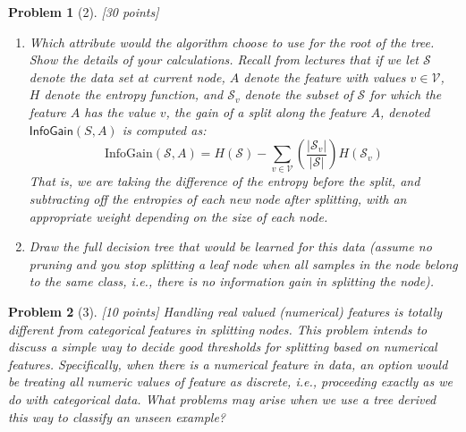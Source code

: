 \documentclass[11pt]{article}
\theoremstyle{quest}
\newtheorem*{problem}{Problem}
\begin{document}
\begin{problem}[2] [30 points]
\begin{enumerate}
    \item Which attribute would the algorithm choose to use for the root of the tree. Show the details of your calculations. Recall from lectures that if we let $\mathcal{S}$ denote the data set at current node, $A$ denote the feature with values $v \in \mathcal{V}$, $H$ denote the entropy function, and $\mathcal{S}_v$ denote the subset of $\mathcal{S}$ for which the feature $A$ has the value $v$, the gain of a split along the feature $A$, denoted $\textsf{InfoGain}(S, A)$ is computed as:
    $$\text{InfoGain}(\mathcal{S}, A) = H(\mathcal{S}) - \sum_{v \in \mathcal{V}}\left(\frac{\lvert\mathcal{S}_v\rvert}{\lvert\mathcal{S}\rvert}\right)H(\mathcal{S}_v)$$
    That is, we are taking the difference of the entropy before the split, and subtracting off the entropies of each new node after splitting, with an appropriate weight depending on the size of each node.
    \item Draw the full decision tree that would be learned for this data (assume no pruning and you stop splitting a leaf node when all samples in the node belong to the same class, i.e., there is no information gain in splitting the node).
\end{enumerate}

\end{problem}

\begin{problem}[3] [10 points]
Handling real valued (numerical) features is totally different from categorical features in splitting nodes. This problem intends to discuss a simple way to decide good thresholds for splitting based on numerical features. Specifically, when there is a numerical feature in data, an option would be treating all numeric values of feature as discrete, i.e., proceeding exactly as we do with categorical data. What problems may arise when we use a tree derived this way to classify an unseen example?
\end{problem}
\end{document}
